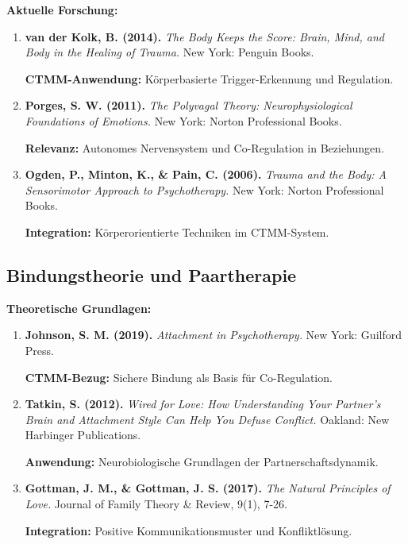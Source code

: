 \begin{ctmmPurpleBox}[title=Trauma-informierte Ansätze]

\textbf{Aktuelle Forschung:}
\begin{enumerate}
    \item \textbf{van der Kolk, B. (2014).} \textit{The Body Keeps the Score: Brain, Mind, and Body in the Healing of Trauma.} New York: Penguin Books.
    
    \textbf{CTMM-Anwendung:} Körperbasierte Trigger-Erkennung und Regulation.
    
    \item \textbf{Porges, S. W. (2011).} \textit{The Polyvagal Theory: Neurophysiological Foundations of Emotions.} New York: Norton Professional Books.
    
    \textbf{Relevanz:} Autonomes Nervensystem und Co-Regulation in Beziehungen.
    
    \item \textbf{Ogden, P., Minton, K., \& Pain, C. (2006).} \textit{Trauma and the Body: A Sensorimotor Approach to Psychotherapy.} New York: Norton Professional Books.
    
    \textbf{Integration:} Körperorientierte Techniken im CTMM-System.
\end{enumerate}

\end{ctmmPurpleBox}

\subsection{Bindungstheorie und Paartherapie}

\begin{ctmmBlueBox}[title=Bindungsbasierte Ansätze]

\textbf{Theoretische Grundlagen:}
\begin{enumerate}
    \item \textbf{Johnson, S. M. (2019).} \textit{Attachment in Psychotherapy.} New York: Guilford Press.
    
    \textbf{CTMM-Bezug:} Sichere Bindung als Basis für Co-Regulation.
    
    \item \textbf{Tatkin, S. (2012).} \textit{Wired for Love: How Understanding Your Partner's Brain and Attachment Style Can Help You Defuse Conflict.} Oakland: New Harbinger Publications.
    
    \textbf{Anwendung:} Neurobiologische Grundlagen der Partnerschaftsdynamik.
    
    \item \textbf{Gottman, J. M., \& Gottman, J. S. (2017).} \textit{The Natural Principles of Love.} Journal of Family Theory \& Review, 9(1), 7-26.
    
    \textbf{Integration:} Positive Kommunikationsmuster und Konfliktlösung.
\end{enumerate}

\end{ctmmBlueBox}

